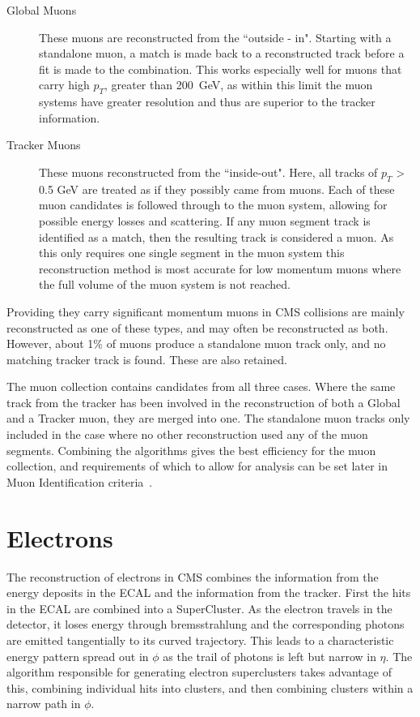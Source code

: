 \begin{description}
\item[Global Muons]{These muons are reconstructed from the ``outside - in". Starting with a standalone muon, a match is made back to a reconstructed track before a fit is made to the combination. This works especially well for muons that carry high $p_{T}$, greater than 200~GeV, as within this limit the muon systems have greater resolution and thus are superior to the tracker information.}
\item[Tracker Muons]{These muons reconstructed from the ``inside-out". Here, all tracks of $p_{T}$ > 0.5 GeV are treated as if they possibly came from muons. Each of these muon candidates is followed through to the muon system, allowing for possible energy losses and scattering.  If any muon segment track is identified as a match, then the resulting track is considered a muon. As this only requires one single segment in the muon system this reconstruction method is most accurate for low momentum muons where the full volume of the muon system is not reached.}

\end{description}

Providing they carry significant momentum muons in CMS collisions are mainly reconstructed as one of these types, and may often be reconstructed as both. However, about 1\% of muons produce a standalone muon track only, and no matching tracker track is found. These are also retained. 

The muon collection contains candidates from all three cases. Where the same track from the tracker has been involved in the reconstruction of both a Global and a Tracker muon, they are merged into one.  The standalone muon tracks only included in the case where no other reconstruction used any of the muon segments. Combining the algorithms gives the best efficiency for the muon collection, and requirements of which to allow for analysis can be set later in Muon Identification criteria~\cite{MUO-10-002}. 

\section{Electrons}

The reconstruction of electrons in CMS combines the information from the energy deposits in the ECAL and the information from the tracker. First the hits in the ECAL are combined into a SuperCluster. As the electron travels in the detector, it loses energy through bremsstrahlung and the corresponding photons are emitted tangentially to its curved trajectory. This leads to a characteristic energy pattern spread out in $\phi$ as the trail of photons is left but narrow in $\eta$. The algorithm responsible for generating electron superclusters takes advantage of this, combining individual hits into clusters, and then combining clusters within a narrow path in $\phi$. 

